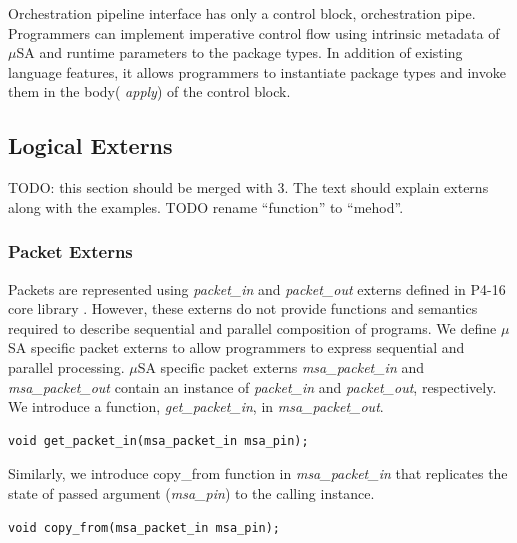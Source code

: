 Orchestration pipeline interface has only a control block, orchestration pipe.
Programmers can implement imperative control flow using intrinsic metadata of $\mu$SA and runtime parameters to the package types.
In addition of existing language features, it allows programmers to instantiate package types and invoke them in the body( \emph{apply}) of the control block.



% 
% 
% 


\subsection{Logical Externs}
\label{subsection:logical-externs}
TODO: this section should be merged with 3. The text should explain externs along with the examples.
TODO rename ``function'' to ``mehod''.
\subsubsection{Packet Externs}
Packets are represented using \emph{packet\-\_in} and \emph{packet\_out} externs defined in P4-16 core library \cite{core.p4}.
However, these externs do not provide functions and semantics required to describe sequential and parallel composition of programs.
We define $\mu$SA specific packet externs to allow programmers to express sequential and parallel processing. 
$\mu$SA specific packet externs \emph{msa\_packet\_in} and \emph{msa\_packet\_out} contain an instance of \emph{packet\_in} and \emph{packet\_out}, respectively.
We introduce a function, \emph{get\-\_packet\-\_in}, in \emph{msa\-\_packet\-\_out}.
\begin{lstlisting}[frame=none]
void get_packet_in(msa_packet_in msa_pin);
\end{lstlisting}
Similarly, we introduce copy\_from function in \emph{msa\_packet\_in} that replicates the state of passed argument (\emph{msa\_pin}) to the calling instance.
\begin{lstlisting}[frame=none]
void copy_from(msa_packet_in msa_pin);
\end{lstlisting}
